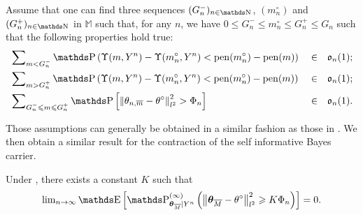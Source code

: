 \begin{as}\label{AS_BAYES_STRATEGIES_EXPOLIM}
Assume that one can find three sequences $(G_{n}^{-})_{n \in \N}$, $(m^{\circ}_{n})$ and $(G_{n}^{+})_{n \in \N}$ in $\mathds{M}$ such that, for any $n$, we have $0 \leq G_{n}^{-} \leq m^{\circ}_{n} \leq G_{n}^{+} \leq G_{n}$ such that the following properties hold true:
\begin{alignat*}{3}
& \sum\nolimits_{m < G^{-}_{n}} \P\left(\Upsilon(m, Y^{n}) - \Upsilon(m^{\circ}_{n}, Y^{n}) < \pen(m^{\circ}_{n}) - \pen(m)\right) && \in && \mathfrak{o}_{n}(1);\\
& \sum\nolimits_{m > G^{+}_{n}} \P\left(\Upsilon(m, Y^{n}) - \Upsilon(m^{\circ}_{n}, Y^{n}) < \pen(m^{\circ}_{n}) - \pen(m)\right) && \in && \mathfrak{o}_{n}(1);\\
& \sum\nolimits_{G^{-}_{n} \leq m \leq G^{+}_{n}} \P\left[\left\Vert \theta_{n, \overline{m}} - \theta^{\circ} \right\Vert_{l^{2}}^{2} > \Phi_{n}\right] && \in && \mathfrak{o}_{n}(1).
\end{alignat*}
\assEnd
\end{as}

Those assumptions can generally be obtained in a similar fashion as those in .
We then obtain a similar result for the contraction of the self informative Bayes carrier.

\begin{thm}\label{THM_BAYES_STRATEGIES_EXPOLIM}
Under , there exists a constant $K$ such that
\[\lim\nolimits_{n \rightarrow \infty} \E\left[\P_{\boldsymbol{\theta}_{\overline{M}} \vert Y^{n}}^{(\infty)}\left(\left\Vert \boldsymbol{\theta}_{\overline{M}} - \theta^{\circ} \right\Vert_{l^{2}}^{2} \geq K \Phi_{n}\right)\right] = 0.\]
\reEnd
\end{thm}

